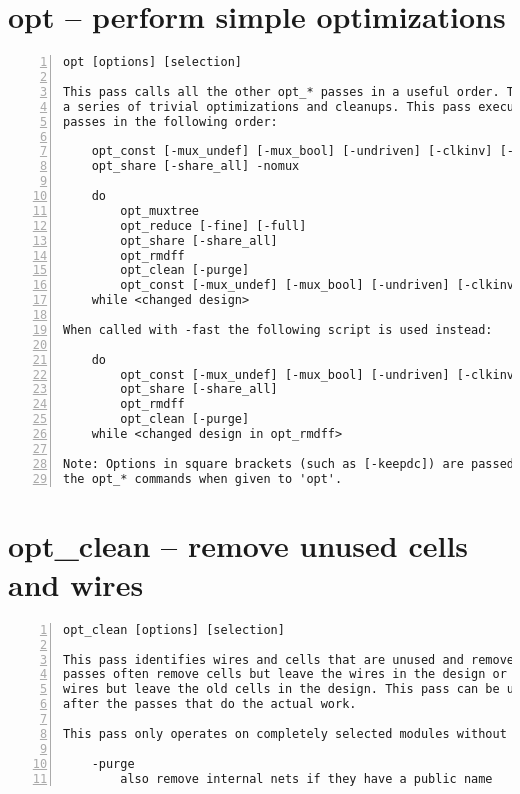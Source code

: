 \section{opt -- perform simple optimizations}
\label{cmd:opt}
\begin{lstlisting}[numbers=left,frame=single]
    opt [options] [selection]

This pass calls all the other opt_* passes in a useful order. This performs
a series of trivial optimizations and cleanups. This pass executes the other
passes in the following order:

    opt_const [-mux_undef] [-mux_bool] [-undriven] [-clkinv] [-fine] [-full] [-keepdc]
    opt_share [-share_all] -nomux

    do
        opt_muxtree
        opt_reduce [-fine] [-full]
        opt_share [-share_all]
        opt_rmdff
        opt_clean [-purge]
        opt_const [-mux_undef] [-mux_bool] [-undriven] [-clkinv] [-fine] [-full] [-keepdc]
    while <changed design>

When called with -fast the following script is used instead:

    do
        opt_const [-mux_undef] [-mux_bool] [-undriven] [-clkinv] [-fine] [-full] [-keepdc]
        opt_share [-share_all]
        opt_rmdff
        opt_clean [-purge]
    while <changed design in opt_rmdff>

Note: Options in square brackets (such as [-keepdc]) are passed through to
the opt_* commands when given to 'opt'.
\end{lstlisting}

\section{opt\_clean -- remove unused cells and wires}
\label{cmd:opt_clean}
\begin{lstlisting}[numbers=left,frame=single]
    opt_clean [options] [selection]

This pass identifies wires and cells that are unused and removes them. Other
passes often remove cells but leave the wires in the design or reconnect the
wires but leave the old cells in the design. This pass can be used to clean up
after the passes that do the actual work.

This pass only operates on completely selected modules without processes.

    -purge
        also remove internal nets if they have a public name
\end{lstlisting}

